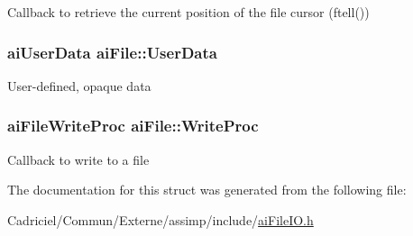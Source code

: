 Callback to retrieve the current position of the file cursor (ftell()) \hypertarget{structai_file_aec528fa18f4755fe4f28d604fde28aad}{
\subsubsection[{User\-Data}]{\setlength{\rightskip}{0pt plus 5cm}ai\-User\-Data ai\-File\-::\-User\-Data}}\label{structai_file_aec528fa18f4755fe4f28d604fde28aad}
User-\/defined, opaque data \hypertarget{structai_file_ab9fca3a62e34a33592c13a6f31db7d1d}{
\subsubsection[{Write\-Proc}]{\setlength{\rightskip}{0pt plus 5cm}ai\-File\-Write\-Proc ai\-File\-::\-Write\-Proc}}\label{structai_file_ab9fca3a62e34a33592c13a6f31db7d1d}
Callback to write to a file 

The documentation for this struct was generated from the following file\-:\begin{DoxyCompactItemize}
\item 
Cadriciel/\-Commun/\-Externe/assimp/include/\hyperlink{ai_file_i_o_8h}{ai\-File\-I\-O.\-h}\end{DoxyCompactItemize}
